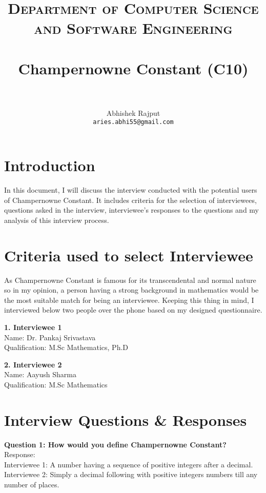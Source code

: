\documentclass[paper=a4, fontsize=11pt]{scrartcl}
\title{
		\usefont{OT1}{bch}{b}{n}
		\normalfont \normalsize \textsc{Department of Computer Science and Software Engineering } \\ [25pt]
		\horrule{0.5pt} \\[0.4cm]
		\huge Champernowne Constant (C10) \\
		\horrule{2pt} \\[0.5cm]
}
\author{Abhishek Rajput\\ \texttt{aries.abhi55@gmail.com}} %
\date{\displaydate{date}}
\numberwithin{equation}{section}		%
\numberwithin{figure}{section}			%
\numberwithin{table}{section}				%
\begin{document}
\maketitle
\section*{Introduction}
In this document, I will discuss the interview conducted with the potential users of Champernowne Constant. \newline
It includes criteria for the selection of interviewees, questions asked in the interview, interviewee's responses to the questions and my analysis of this interview process.

\section*{Criteria used to select Interviewee}
As Champernowne Constant is famous for its transcendental and normal nature so in my opinion, a person having a strong background in mathematics would be the most suitable match for being an interviewee.
Keeping this thing in mind, I interviewed below two people over the phone based on my designed questionnaire.

\begin{flushleft}
\textbf{1. Interviewee 1}
\\Name: Dr. Pankaj Srivastava 
\\Qualification: M.Sc Mathematics, Ph.D
\end{flushleft}

\begin{flushleft}
\textbf{2. Interviewee 2}
\\Name: Aayush Sharma 
\\Qualification: M.Sc Mathematics
\end{flushleft}

\section*{Interview Questions \& Responses}
\begin{flushleft}
\textbf{Question 1: How would you define Champernowne Constant?}
\\Response:
\\Interviewee 1: A number having a sequence of positive integers after a decimal.
\\Interviewee 2: Simply a decimal following with positive integers numbers till any number of places.
\end{flushleft}
\end{document}
